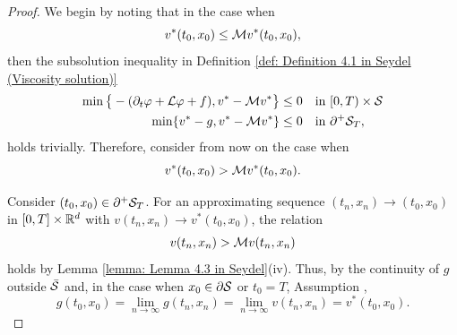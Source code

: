\begin{proof}
    We begin by noting that in the case when
    \begin{equation*}
        v^*(t_0,x_0) \leq \mathcal{M} v^*(t_0,x_0),
    \end{equation*}
    then the subsolution inequality in Definition \ref{def: Definition 4.1 in Seydel (Viscosity solution)}
    \begin{align*}
        \min \big\{ -(\partial_t \varphi + \mathcal{L} \varphi + f), v^* - \mathcal{M} v^* \big \} & \leq 0 \quad \text{in } [0,T) \times \mathcal{S} \\
        \min \{ v^* - g, v^* - \mathcal{M} v^*\} & \leq 0 \quad \text{in } \partial^+ \mathcal{S}_T,
    \end{align*}
    holds trivially. Therefore, consider from now on the case when 
    \begin{equation*}
        v^*(t_0,x_0) > \mathcal{M} v^*(t_0,x_0).
    \end{equation*}

    Consider $(t_0,x_0) \in \partial^+ \mathcal{S}_T$. For an approximating sequence $(t_n,x_n) \rightarrow (t_0,x_0)$ in $[0,T] \times \mathbb{R}^d$ with $v(t_n,x_n) \rightarrow v^*(t_0,x_0)$, the relation 
    \begin{equation*}
        v(t_n,x_n) > \mathcal{M} v(t_n,x_n)
    \end{equation*}
    holds by Lemma \ref{lemma: Lemma 4.3 in Seydel}(iv). Thus, by the continuity of $g$ outside $\bar {\mathcal{S}}$ and, in the case when $x_0 \in \partial \mathcal{S}$ or $t_0=T$, Assumption ,
    \begin{equation*}
        g(t_0,x_0) = \lim_{n \rightarrow \infty} g(t_n,x_n) = \lim_{n \rightarrow \infty} v(t_n,x_n) = v^*(t_0,x_0). 
    \end{equation*}
    

\end{proof}
